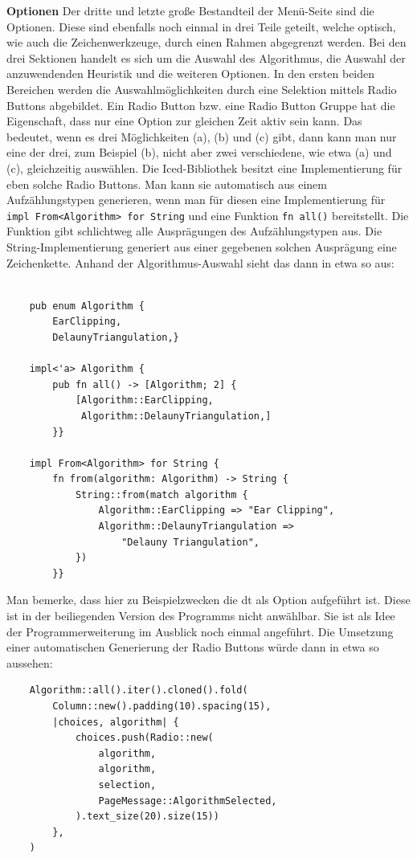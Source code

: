 \textbf{\large{Optionen}}\linebreak
Der dritte und letzte große Bestandteil der Menü-Seite sind die Optionen. Diese sind ebenfalls noch einmal in drei Teile geteilt, welche optisch, wie auch die Zeichenwerkzeuge, durch einen Rahmen 
abgegrenzt werden. Bei den drei Sektionen handelt es sich um die Auswahl des Algorithmus, die Auswahl der anzuwendenden Heuristik und die weiteren Optionen.
In den ersten beiden Bereichen werden die Auswahlmöglichkeiten durch eine Selektion mittels Radio Buttons abgebildet. Ein Radio Button bzw. eine Radio Button Gruppe hat die Eigenschaft, dass nur eine Option zur gleichen Zeit aktiv sein kann.
Das bedeutet, wenn es drei Möglichkeiten (a), (b) und (c) gibt, dann kann man nur eine der drei, zum Beispiel (b), nicht aber zwei verschiedene, wie etwa (a) und (c), gleichzeitig auswählen.
Die Iced-Bibliothek besitzt eine Implementierung für eben solche Radio Buttons. Man kann sie automatisch aus einem Aufzählungstypen generieren, wenn man für diesen eine Implementierung für \lstinline{impl From<Algorithm> for String} und eine Funktion 
\lstinline{fn all()} bereitstellt. Die Funktion gibt schlichtweg alle Ausprägungen des Aufzählungstypen aus. Die String-Implementierung generiert aus einer gegebenen solchen Ausprägung eine Zeichenkette.
Anhand der Algorithmus-Auswahl sieht das dann in etwa so aus:

\begin{lstlisting}

    pub enum Algorithm {
        EarClipping,
        DelaunyTriangulation,}

    impl<'a> Algorithm {
        pub fn all() -> [Algorithm; 2] {
            [Algorithm::EarClipping,
             Algorithm::DelaunyTriangulation,]
        }}

    impl From<Algorithm> for String {
        fn from(algorithm: Algorithm) -> String {
            String::from(match algorithm {
                Algorithm::EarClipping => "Ear Clipping",
                Algorithm::DelaunyTriangulation => 
                    "Delauny Triangulation",
            })
        }}
\end{lstlisting}
Man bemerke, dass hier zu Beispielzwecken die \ac{dt} als Option aufgeführt ist. Diese ist in der beiliegenden Version des Programms nicht anwählbar. Sie 
ist als Idee der Programmerweiterung im Ausblick noch einmal angeführt.
Die Umsetzung einer automatischen Generierung der Radio Buttons würde dann in etwa so aussehen:

\begin{lstlisting}
    Algorithm::all().iter().cloned().fold(
        Column::new().padding(10).spacing(15),
        |choices, algorithm| {
            choices.push(Radio::new(
                algorithm,
                algorithm,
                selection,
                PageMessage::AlgorithmSelected,
            ).text_size(20).size(15))
        },
    )
\end{lstlisting}

